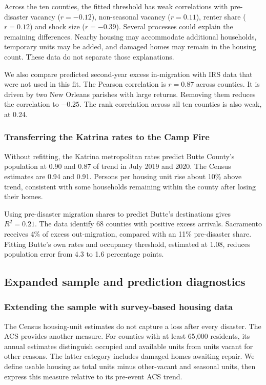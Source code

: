 \documentclass[11pt]{article}
\begin{document}
Across the ten counties, the fitted threshold has weak correlations with pre-disaster vacancy ($r=-0.12$), non-seasonal vacancy ($r=0.11$), renter share ($r=0.12$) and shock size ($r=-0.39$). Several processes could explain the remaining differences. Nearby housing may accommodate additional households, temporary units may be added, and damaged homes may remain in the housing count. These data do not separate those explanations.

We also compare predicted second-year excess in-migration with IRS data that were not used in this fit. The Pearson correlation is $r=0.87$ across counties. It is driven by two New Orleans parishes with large returns. Removing them reduces the correlation to $-0.25$. The rank correlation across all ten counties is also weak, at 0.24.

\subsubsection{Transferring the Katrina rates to the Camp Fire}
Without refitting, the Katrina metropolitan rates predict Butte County's population at 0.90 and 0.87 of trend in July 2019 and 2020. The Census estimates are 0.94 and 0.91. Persons per housing unit rise about 10\% above trend, consistent with some households remaining within the county after losing their homes.

Using pre-disaster migration shares to predict Butte's destinations gives $R^2=0.21$. The data identify 68 counties with positive excess arrivals. Sacramento receives 4\% of excess out-migration, compared with an 11\% pre-disaster share. Fitting Butte's own rates and occupancy threshold, estimated at 1.08, reduces population error from 4.3 to 1.6 percentage points.





\subsection{Expanded sample and prediction diagnostics}\label{si:expanded}
\subsubsection{Extending the sample with survey-based housing data}
The Census housing-unit estimates do not capture a loss after every disaster. The ACS provides another measure. For counties with at least 65{,}000 residents, its annual estimates distinguish occupied and available units from units vacant for other reasons. The latter category includes damaged homes awaiting repair. We define usable housing as total units minus other-vacant and seasonal units, then express this measure relative to its pre-event ACS trend.
\end{document}
